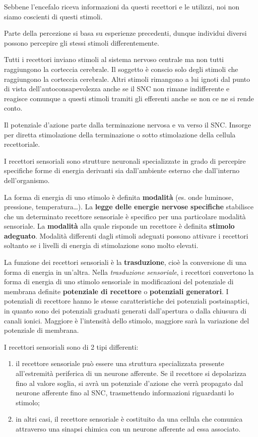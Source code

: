 \documentclass[]{article}
\begin{document}
Sebbene l'encefalo riceva informazioni da questi recettori e le
utilizzi, noi non siamo coscienti di questi stimoli.

Parte della percezione si basa su esperienze precedenti, dunque
individui diversi possono percepire gli stessi stimoli differentemente.

Tutti i recettori inviano stimoli al sistema nervoso centrale ma non
tutti raggiungono la corteccia cerebrale. Il soggetto è conscio solo
degli stimoli che raggiungono la corteccia cerebrale. Altri stimoli
rimangono a lui ignoti dal punto di vista dell'autoconsapevolezza anche
se il SNC non rimane indifferente e reagisce comunque a questi stimoli
tramiti gli efferenti anche se non ce ne si rende conto.

Il potenziale d'azione parte dalla terminazione nervosa e va verso il
SNC. Insorge per diretta stimolazione della terminazione o sotto
stimolazione della cellula recettoriale.

I recettori sensoriali sono strutture neuronali specializzate in grado
di percepire specifiche forme di energia derivanti sia dall'ambiente
esterno che dall'interno dell'organismo.

La forma di energia di uno stimolo è definita \textbf{modalità} (es.
onde luminose, pressione, temperatura\ldots{}). La \textbf{legge delle
energie nervose specifiche} stabilisce che un determinato recettore
sensoriale è specifico per una particolare modalità sensoriale. La
\textbf{modalità} alla quale risponde un recettore è definita
\textbf{stimolo adeguato}. Modalità differenti dagli stimoli adeguati
possono attivare i recettori soltanto se i livelli di energia di
stimolazione sono molto elevati.

La funzione dei recettori sensoriali è la \textbf{trasduzione}, cioè la
conversione di una forma di energia in un'altra. Nella \emph{trasduzione
sensoriale}, i recettori convertono la forma di energia di uno stimolo
sensoriale in modificazioni del potenziale di membrana definite
\textbf{potenziale di recettore} o \textbf{potenziali generatori}. I
potenziali di recettore hanno le stesse caratteristiche dei potenziali
postsinaptici, in quanto sono dei potenziali graduati generati
dall'apertura o dalla chiusura di canali ionici. Maggiore è l'intensità
dello stimolo, maggiore sarà la variazione del potenziale di membrana.

I recettori sensoriali sono di 2 tipi differenti:

\begin{enumerate}
\def\labelenumi{\arabic{enumi}.}
\itemsep1pt\parskip0pt
\item
  il recettore sensoriale può essere una struttura specializzata
  presente all'estremità periferica di un neurone afferente. Se il
  recettore si depolarizza fino al valore soglia, si avrà un potenziale
  d'azione che verrà propagato dal neurone afferente fino al SNC,
  trasmettendo informazioni riguardanti lo stimolo;
\item
  in altri casi, il recettore sensoriale è costituito da una cellula che
  comunica attraverso una sinapsi chimica con un neurone afferente ad
  essa associato.
\end{enumerate}
\end{document}
